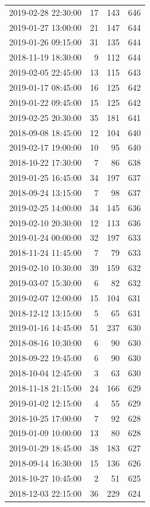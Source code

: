 \begin{tabular}{lrrr}
2019-02-28 22:30:00 & 17 & 143 & 646 \\
2019-01-27 13:00:00 & 21 & 147 & 644 \\
2019-01-26 09:15:00 & 31 & 135 & 644 \\
2018-11-19 18:30:00 & 9 & 112 & 644 \\
2019-02-05 22:45:00 & 13 & 115 & 643 \\
2019-01-17 08:45:00 & 16 & 125 & 642 \\
2019-01-22 09:45:00 & 15 & 125 & 642 \\
2019-02-25 20:30:00 & 35 & 181 & 641 \\
2018-09-08 18:45:00 & 12 & 104 & 640 \\
2019-02-17 19:00:00 & 10 & 95 & 640 \\
2018-10-22 17:30:00 & 7 & 86 & 638 \\
2019-01-25 16:45:00 & 34 & 197 & 637 \\
2018-09-24 13:15:00 & 7 & 98 & 637 \\
2019-02-25 14:00:00 & 34 & 145 & 636 \\
2019-02-10 20:30:00 & 12 & 113 & 636 \\
2019-01-24 00:00:00 & 32 & 197 & 633 \\
2018-11-24 11:45:00 & 7 & 79 & 633 \\
2019-02-10 10:30:00 & 39 & 159 & 632 \\
2019-03-07 15:30:00 & 6 & 82 & 632 \\
2019-02-07 12:00:00 & 15 & 104 & 631 \\
2018-12-12 13:15:00 & 5 & 65 & 631 \\
2019-01-16 14:45:00 & 51 & 237 & 630 \\
2018-08-16 10:30:00 & 6 & 90 & 630 \\
2018-09-22 19:45:00 & 6 & 90 & 630 \\
2018-10-04 12:45:00 & 3 & 63 & 630 \\
2018-11-18 21:15:00 & 24 & 166 & 629 \\
2019-01-02 12:15:00 & 4 & 55 & 629 \\
2018-10-25 17:00:00 & 7 & 92 & 628 \\
2019-01-09 10:00:00 & 13 & 80 & 628 \\
2019-01-29 18:45:00 & 38 & 183 & 627 \\
2018-09-14 16:30:00 & 15 & 136 & 626 \\
2018-10-27 10:45:00 & 2 & 51 & 625 \\
2018-12-03 22:15:00 & 36 & 229 & 624 \\

\end{tabular}
